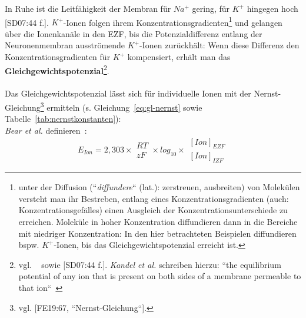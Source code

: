 {In Ruhe ist die Leitfähigkeit der Membran für $Na^+$ gering, für $K^+$ hingegen hoch [SD07:44 f.].
$K^+$-Ionen folgen ihrem Konzentrationsgradienten\footnote{
 unter der Diffusion (``\textit{diffundere}`` (lat.): zerstreuen, ausbreiten) von Molekülen versteht man ihr Bestreben, entlang eines Konzentrationsgradienten (auch: Konzentrationsgefälles) einen Ausgleich der Konzentrationsunterschiede zu erreichen. Moleküle in hoher Konzentration diffundieren dann in die Bereiche mit niedriger Konzentration: In den hier betrachteten Beispielen diffundieren bspw. $K^+$-Ionen, bis das Gleichgewichtspotenzial erreicht ist.
} und gelangen über die Ionenkanäle in den EZF, bis die Potenzialdifferenz entlang der Neuronenmembran ausströmende $K^+$-Ionen zurückhält: Wenn diese Differenz den Konzentrationsgradienten für $K^+$ kompensiert, erhält man das \textbf{Gleichgewichtspotenzial}\footnote{
 vgl. ~\cite[72]{BCP18} sowie [SD07:44 f.]. \textit{Kandel et al.} schreiben hierzu:
 ``the equilibrium potential of any ion that is present on both sides of a membrane permeable to that ion``~\cite[130]{KSJ+13}
}.\\

\noindent{}\\


Das Gleichgewichtspotenzial lässt sich für individuelle Ionen mit der Nernst-Gleichung\footnote{
 vgl. {[FE19:67, ``Nernst-Gleichung``]}.
} ermitteln (s. Gleichung~\ref{eq:gl-nernst} sowie Tabelle~\ref{tab:nernstkonstanten}):\\

\textit{Bear et al.} definieren~\cite[74, Exkurs 3.2]{BCP18}:
\begin{equation}
E_{Ion} = 2,303  \times \begin{matrix} RT \\ \hline zF \end{matrix} \times log_{10} \times \begin{matrix} [Ion]_{EZF} \\ \hline [Ion]_{IZF} \end{matrix}
\label{eq:gl-nernst}
\end{equation}



}
